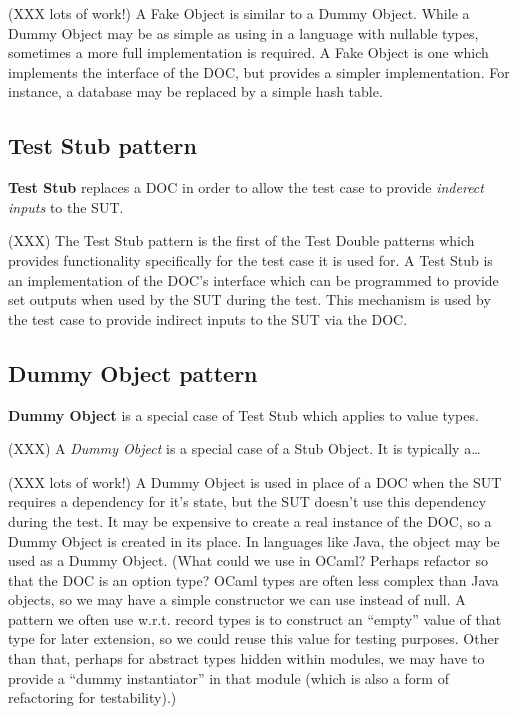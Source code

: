 (XXX lots of work!) A Fake Object is similar to a Dummy Object. While
a Dummy Object may be as simple as using  in a language
with nullable types, sometimes a more full implementation is
required. A Fake Object is one which implements the interface of the
DOC, but provides a simpler implementation. For instance, a database
may be replaced by a simple hash table.


\subsection{Test Stub pattern}
\label{testdoubles:stub}

\textbf{Test Stub} replaces a DOC in order to allow the test case to
provide \textit{inderect inputs} to the SUT.

(XXX) The Test Stub pattern is the first of the Test Double patterns
which provides functionality specifically for the test case it is used
for. A Test Stub is an implementation of the DOC's interface which can
be programmed to provide set outputs when used by the SUT during the
test. This mechanism is used by the test case to provide indirect
inputs to the SUT via the DOC.


\subsection{Dummy Object pattern}
\label{testdoubles:dummy}

\textbf{Dummy Object} is a special case of Test Stub which applies to
value types. %

(XXX) A \textit{Dummy Object} is a special case of a Stub Object. It is
typically a\dots

(XXX lots of work!) A Dummy Object is used in place of a DOC when the
SUT requires a dependency for it's state, but the SUT doesn't use this
dependency during the test. It may be expensive to create a real
instance of the DOC, so a Dummy Object is created in its place. In
languages like Java, the  object may be used as a Dummy
Object. (What could we use in OCaml? Perhaps refactor so that the DOC
is an option type? OCaml types are often less complex than Java
objects, so we may have a simple constructor we can use instead of
null. A pattern we often use w.r.t. record types is to construct an
``empty'' value of that type for later extension, so we could reuse
this value for testing purposes. Other than that, perhaps for abstract
types hidden within modules, we may have to provide a ``dummy
instantiator'' in that module (which is also a form of refactoring for
testability).)

